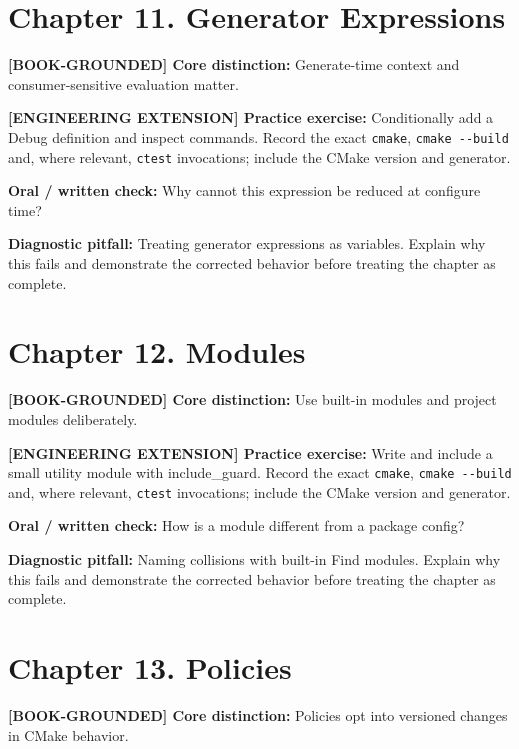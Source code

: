 \documentclass[11pt,letterpaper,oneside]{report}
\providecommand{\passthrough}[1]{#1}
\begin{document}
\section{Chapter 11. Generator
Expressions}\label{chapter-11.-generator-expressions}

\textbf{{[}BOOK-GROUNDED{]} Core distinction:} Generate-time context and
consumer-sensitive evaluation matter.

\textbf{{[}ENGINEERING EXTENSION{]} Practice exercise:} Conditionally
add a Debug definition and inspect commands. Record the exact
\passthrough{\lstinline!cmake!}, \passthrough{\lstinline!cmake --build!}
and, where relevant, \passthrough{\lstinline!ctest!} invocations;
include the CMake version and generator.

\textbf{Oral / written check:} Why cannot this expression be reduced at
configure time?

\textbf{Diagnostic pitfall:} Treating generator expressions as
variables. Explain why this fails and demonstrate the corrected behavior
before treating the chapter as complete.

\section{Chapter 12. Modules}\label{chapter-12.-modules}

\textbf{{[}BOOK-GROUNDED{]} Core distinction:} Use built-in modules and
project modules deliberately.

\textbf{{[}ENGINEERING EXTENSION{]} Practice exercise:} Write and
include a small utility module with include\_guard. Record the exact
\passthrough{\lstinline!cmake!}, \passthrough{\lstinline!cmake --build!}
and, where relevant, \passthrough{\lstinline!ctest!} invocations;
include the CMake version and generator.

\textbf{Oral / written check:} How is a module different from a package
config?

\textbf{Diagnostic pitfall:} Naming collisions with built-in Find
modules. Explain why this fails and demonstrate the corrected behavior
before treating the chapter as complete.

\section{Chapter 13. Policies}\label{chapter-13.-policies}

\textbf{{[}BOOK-GROUNDED{]} Core distinction:} Policies opt into
versioned changes in CMake behavior.
\end{document}
